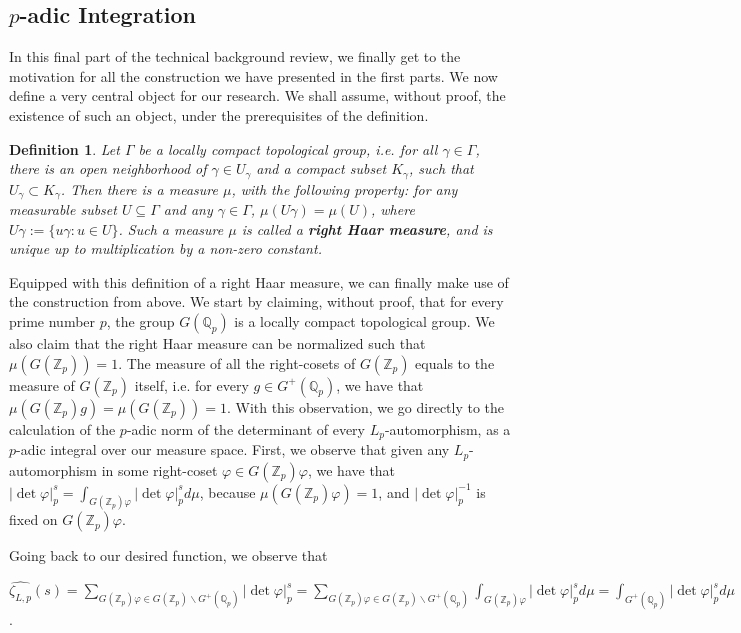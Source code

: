 \documentclass[12pt]{article}
\newtheorem{definition}[theorem]{Definition}
\begin{document}
\subsection{$p$-adic Integration}
In this final part of the technical background review, we finally get to the motivation for all the construction we have presented in the first parts. We now define a very central object for our research. We shall assume, without proof, the existence of such an object, under the prerequisites of the definition.
\begin{definition}
\label{def.right.haar.measure}
Let $\Gamma$ be a locally compact topological group, i.e. for all $\gamma\in\Gamma$, there is an open neighborhood of $\gamma\in U_{\gamma}$ and a compact subset $K_{\gamma}$, such that $U_{\gamma}\subset K_{\gamma}$. Then there is a measure $\mu$, with the following property: for any measurable subset $U\subseteq\Gamma$ and any $\gamma\in\Gamma$, $\mu(U\gamma)=\mu(U)$, where $U\gamma:=\{u\gamma : u\in U\}$. Such a measure $\mu$ is called a \textbf{right Haar measure}, and is unique up to multiplication by a non-zero constant.
\end{definition}
Equipped with this definition of a right Haar measure, we can finally make use of the construction from above. We start by claiming, without proof, that for every prime number $p$, the group $G(\mathbb{Q}_p)$ is a locally compact topological group. We also claim that the right Haar measure can be normalized such that $\mu(G(\mathbb{Z}_p))=1$. The measure of all the right-cosets of $G(\mathbb{Z}_p)$ equals to the measure of $G(\mathbb{Z}_p)$ itself, i.e. for every $g\in G^+(\mathbb{Q}_p)$, we have that $\mu(G(\mathbb{Z}_p)g)=\mu(G(\mathbb{Z}_p))=1$.
With this observation, we go directly to the calculation of the $p$-adic norm of the determinant of every $L_{p}$-automorphism, as a $p$-adic integral over our measure space.
First, we observe that given any $L_{p}$-automorphism in some right-coset $\varphi\in G(\mathbb{Z}_p)\varphi$, we have that $|\det\varphi|_p^s=\displaystyle\int_{G(\mathbb{Z}_p)\varphi}|\det\varphi|_p^sd\mu$, because $\mu(G(\mathbb{Z}_p)\varphi)=1$, and $|\det\varphi|_p^{-1}$ is fixed on $G(\mathbb{Z}_p)\varphi$.\par
Going back to our desired function, we observe that\par $\hat{\zeta_{L,p}}(s)=\underset{\scriptscriptstyle G(\mathbb{Z}_p)\varphi\in G(\mathbb{Z}_p)\backslash G^+(\mathbb{Q}_p)}{\sum}|\det\varphi|_p^s=\underset{\scriptscriptstyle G(\mathbb{Z}_p)\varphi\in G(\mathbb{Z}_p)\backslash G^+(\mathbb{Q}_p)}{\sum}\displaystyle\int_{G(\mathbb{Z}_p)\varphi}|\det\varphi|_p^sd\mu=\displaystyle\int_{G^+(\mathbb{Q}_p)}|\det\varphi|_p^sd\mu$.\par 
\end{document}
